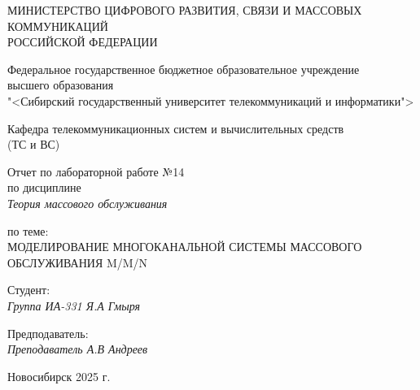 \thispagestyle{empty}

\begin{center}
    МИНИСТЕРСТВО ЦИФРОВОГО РАЗВИТИЯ, СВЯЗИ И МАССОВЫХ КОММУНИКАЦИЙ \\ РОССИЙСКОЙ ФЕДЕРАЦИИ

    \vspace{20pt}

    Федеральное государственное бюджетное образовательное учреждение  \\  высшего образования \\
    "<Сибирский государственный университет телекоммуникаций и информатики"> \\

    \vspace{20pt}

    Кафедра телекоммуникационных систем и вычислительных средств \\  (ТС и ВС)
\end{center}

\vfill

\begin{center}
    Отчет по лабораторной работе №14 \\  
    по дисциплине \\
    \textit{Теория массового обслуживания}

    \vspace{20pt} 
    по теме: \\
    \uppercase{Моделирование многоканальной системы массового обслуживания M/M/n}
\end{center}

\vfill

    \noindent Студент: \\
    \textit{Группа ИА-331 \hfill Я.А Гмыря}

    \vspace{20pt}

    \noindent Предподаватель: \\
    \textit{Преподаватель \hfill А.В Андреев}

\vfill

\begin{center}
    Новосибирск 2025 г.
\end{center}